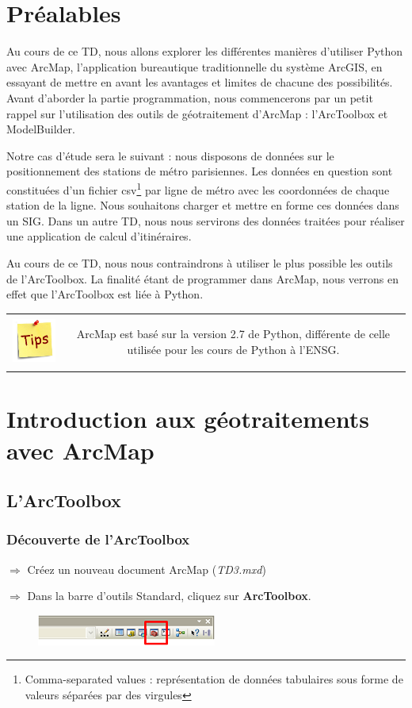 \documentclass[11pt]{article}
\newcommand{\action}{$\Rightarrow$ }
\newenvironment{note}{%
	\begin{tabular}[t t]{c c}
		\includegraphics{img/tips.png}
		 &
		\begin{minipage}[c]{0.9\linewidth}
			\begin{sffamily}
}{%
			\end{sffamily}
		\end{minipage}
	\end{tabular}
}
\begin{document}
\section*{Préalables}
Au cours de ce TD, nous allons explorer les différentes manières d'utiliser Python avec ArcMap, l'application bureautique traditionnelle du système ArcGIS, en essayant de mettre en avant les avantages et limites de chacune des possibilités. Avant d'aborder la partie programmation, nous commencerons par un petit rappel sur l'utilisation des outils de géotraitement d'ArcMap : l'ArcToolbox et ModelBuilder.


Notre cas d'étude sera le suivant : nous disposons de données sur le positionnement des stations de métro parisiennes. Les données en question sont constituées d'un fichier csv\footnote{Comma-separated values : représentation de données tabulaires sous forme de valeurs séparées par des virgules} par ligne de métro avec les coordonnées de chaque station de la ligne. Nous souhaitons charger et mettre en forme ces données dans un SIG. Dans un autre TD, nous nous servirons des données traitées pour réaliser une application de calcul d'itinéraires.

Au cours de ce TD, nous nous contraindrons à utiliser le plus possible les outils de l'ArcToolbox. La finalité étant de programmer dans ArcMap, nous verrons en effet que l'ArcToolbox est liée à Python.

\begin{note}
ArcMap est basé sur la version 2.7 de Python, différente de celle utilisée pour les cours de Python à l'ENSG.
\end{note}



\section{Introduction aux géotraitements avec ArcMap}

\subsection{L'ArcToolbox}
\subsubsection{Découverte de l'ArcToolbox}
\action Créez un nouveau document ArcMap (\textit{TD3.mxd})

\action Dans la barre d'outils Standard, cliquez sur \textbf{ArcToolbox}.
\begin{figure}[H]
	\center \includegraphics{img/td3/arctoolbox_bouton.png}\\
\end{figure}
\end{document}
